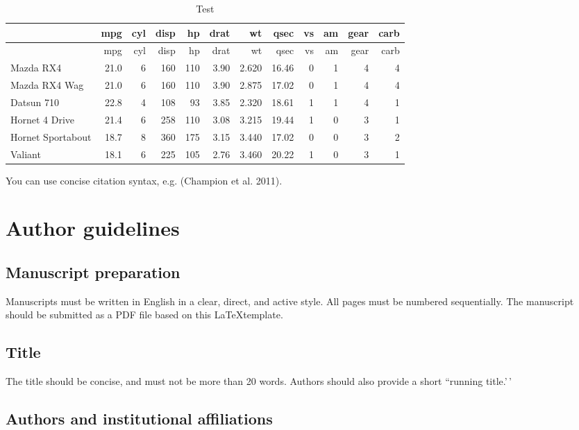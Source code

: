 \documentclass{josis}
\begin{document}
\begin{longtable}[]{@{}lrrrrrrrrrrr@{}}
\caption{Test}\tabularnewline
\toprule
& mpg & cyl & disp & hp & drat & wt & qsec & vs & am & gear & carb \\
\midrule
\endfirsthead
\toprule
& mpg & cyl & disp & hp & drat & wt & qsec & vs & am & gear & carb \\
\midrule
\endhead
Mazda RX4 & 21.0 & 6 & 160 & 110 & 3.90 & 2.620 & 16.46 & 0 & 1 & 4 &
4 \\
Mazda RX4 Wag & 21.0 & 6 & 160 & 110 & 3.90 & 2.875 & 17.02 & 0 & 1 & 4
& 4 \\
Datsun 710 & 22.8 & 4 & 108 & 93 & 3.85 & 2.320 & 18.61 & 1 & 1 & 4 &
1 \\
Hornet 4 Drive & 21.4 & 6 & 258 & 110 & 3.08 & 3.215 & 19.44 & 1 & 0 & 3
& 1 \\
Hornet Sportabout & 18.7 & 8 & 360 & 175 & 3.15 & 3.440 & 17.02 & 0 & 0
& 3 & 2 \\
Valiant & 18.1 & 6 & 225 & 105 & 2.76 & 3.460 & 20.22 & 1 & 0 & 3 & 1 \\
\bottomrule
\end{longtable}

You can use concise citation syntax, e.g. (Champion et al. 2011).

\hypertarget{author-guidelines}{%
\section{Author guidelines}\label{author-guidelines}}

\subsection{Manuscript preparation}

Manuscripts must be written in English in a clear, direct, and active
style. All pages must be numbered sequentially. The manuscript should be
submitted as a PDF file based on this \LaTeX template.

\subsection{Title}

The title should be concise, and must not be more than 20 words. Authors
should also provide a short ``running title.'\,'

\subsection{Authors and institutional affiliations}
\end{document}
